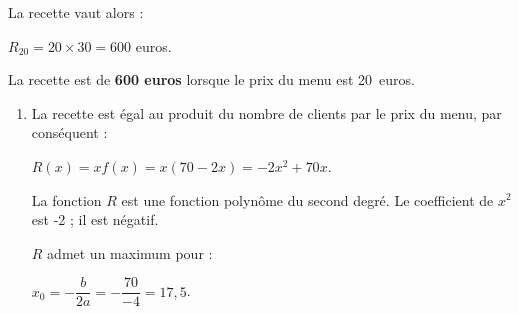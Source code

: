 \begin{corrige}
\begin{enumerate}
          \par
          La recette vaut alors :
          \par
          $R_{20}=20 \times 30 = 600$ euros.
          \par
          La recette est de \textbf{600 euros} lorsque le prix du menu est 20~euros.
          \par
     \end{enumerate}
     \par
     \par
     \begin{enumerate}
          \item %
          La recette est égal au produit du nombre de clients par le prix du menu, par conséquent :
          \par
          $R(x)=xf(x)=x(70-2x)$\nosp$=-2x^2+70x$.
          \par
          La fonction $R$ est une fonction polynôme du second degré. Le coefficient de $x^2$ est -2 ; il est négatif.
          \par
          $R$ admet un maximum pour :
          \par
          $x_0=-\dfrac{b}{2a}=-\dfrac{70}{-4}=17,5$.
          \medskip


\end{enumerate}
\end{corrige}
